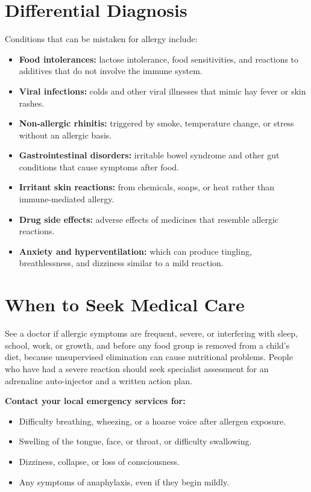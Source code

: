 \section*{Differential Diagnosis}
Conditions that can be mistaken for allergy include:

\begin{itemize}
    \item \textbf{Food intolerances:} lactose intolerance, food sensitivities, and reactions to additives that do not involve the immune system.
    \item \textbf{Viral infections:} colds and other viral illnesses that mimic hay fever or skin rashes.
    \item \textbf{Non-allergic rhinitis:} triggered by smoke, temperature change, or stress without an allergic basis.
    \item \textbf{Gastrointestinal disorders:} irritable bowel syndrome and other gut conditions that cause symptoms after food.
    \item \textbf{Irritant skin reactions:} from chemicals, soaps, or heat rather than immune-mediated allergy.
    \item \textbf{Drug side effects:} adverse effects of medicines that resemble allergic reactions.
    \item \textbf{Anxiety and hyperventilation:} which can produce tingling, breathlessness, and dizziness similar to a mild reaction.
\end{itemize}

\section*{When to Seek Medical Care}
See a doctor if allergic symptoms are frequent, severe, or interfering with sleep, school, work, or growth, and before any food group is removed from a child's diet, because unsupervised elimination can cause nutritional problems. People who have had a severe reaction should seek specialist assessment for an adrenaline auto-injector and a written action plan.

\textbf{Contact your local emergency services for:}
\begin{itemize}
    \item Difficulty breathing, wheezing, or a hoarse voice after allergen exposure.
    \item Swelling of the tongue, face, or throat, or difficulty swallowing.
    \item Dizziness, collapse, or loss of consciousness.
    \item Any symptoms of anaphylaxis, even if they begin mildly.
\end{itemize}

